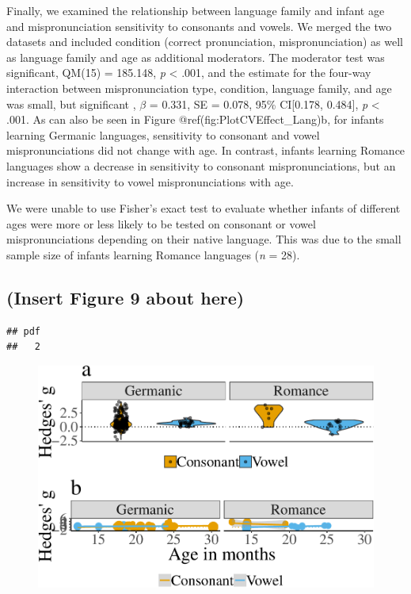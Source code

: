 \documentclass[man]{apa6}
\theoremstyle{definition}
\theoremstyle{definition}
\theoremstyle{definition}
\theoremstyle{remark}
\begin{document}
Finally, we examined the relationship between language family and infant
age and mispronunciation sensitivity to consonants and vowels. We merged
the two datasets and included condition (correct pronunciation,
mispronunciation) as well as language family and age as additional
moderators. The moderator test was significant, QM(15) = 185.148,
\emph{p} \textless{} .001, and the estimate for the four-way interaction
between mispronunciation type, condition, language family, and age was
small, but significant , \(\beta\) = 0.331, SE = 0.078, 95\% CI{[}0.178,
0.484{]}, \emph{p} \textless{} .001. As can also be seen in Figure
@ref(fig:PlotCVEffect\_Lang)b, for infants learning Germanic languages,
sensitivity to consonant and vowel mispronunciations did not change with
age. In contrast, infants learning Romance languages show a decrease in
sensitivity to consonant mispronunciations, but an increase in
sensitivity to vowel mispronunciations with age.

We were unable to use Fisher's exact test to evaluate whether infants of
different ages were more or less likely to be tested on consonant or
vowel mispronunciations depending on their native language. This was due
to the small sample size of infants learning Romance languages (\emph{n}
= 28).

\subsection{(Insert Figure 9 about
here)}\label{insert-figure-9-about-here}

\begin{verbatim}
## pdf 
##   2
\end{verbatim}

\begin{figure}
\centering
\includegraphics{VonHolzenBergmann_MPMetaAnalysis_files/figure-latex/PlotCVEffect_Lang-1.pdf}
\caption{}
\end{figure}
\end{document}
